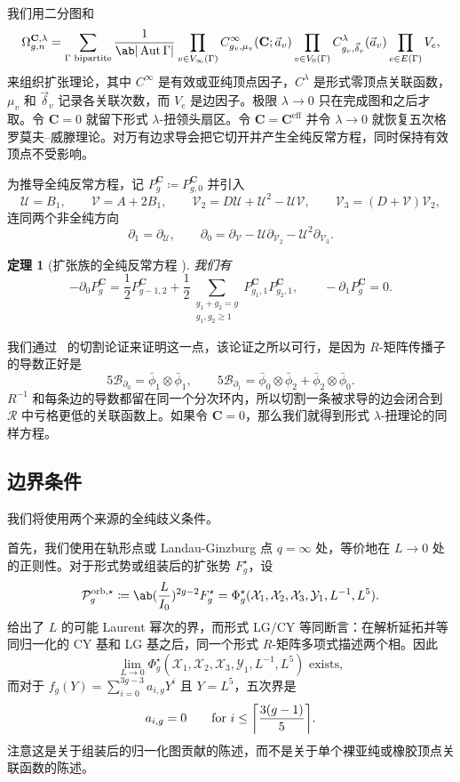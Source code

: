 \documentclass{amsart}
\newtheorem{thm}{定理}[section]
\theoremstyle{definition}
\theoremstyle{remark}
\theoremstyle{plain}
\theoremstyle{definition}
\theoremstyle{remark}
\DeclarePairedDelimiter{\ceil}{\lceil}{\rceil}
\newcommand{\g}{\mathfrak{g}}
\newcommand{\mc}[1]{\mathcal{#1}}
\newcommand{\mbf}[1]{\mathbf{#1}}
\newcommand{\mr}[1]{\mathrm{#1}}
\newcommand{\1}{\mathbf{1}}
\newcommand{\2}{\mathbf{2}}
\newcommand{\3}{\mathbf{3}}
\DeclareMathOperator{\Aut}{Aut}
\begin{document}
我们用二分图和
\[ \Omega^{\mbf{C},\lambda}_{g,n} = \sum_{\Gamma \text{ bipartite}} \frac{1}{\ab|\Aut\Gamma|}\prod_{v\in V_{\infty}(\Gamma)} C^{\infty}_{g_v,\mu_v}(\mbf{C};\vec{a}_v) \prod_{v \in V_0(\Gamma)}C^{\lambda}_{g_v,\vec{\delta}_v}(\vec{a}_v)\prod_{e \in E(\Gamma)}V_e, \]
来组织扩张理论，其中 \(C^{\infty}\) 是有效或亚纯顶点因子，\(C^{\lambda}\) 是形式零顶点关联函数，\(\mu_v\) 和 \(\vec{\delta}_v\) 记录各关联次数，而 \(V_e\) 是边因子。极限 \(\lambda \to 0\) 只在完成图和之后才取。令 \(\mbf{C}=0\) 就留下形式 \(\lambda\)-扭领头扇区。令 \(\mbf{C}=\mbf{C}^{\mr{eff}}\) 并令 \(\lambda\to0\) 就恢复五次格罗莫夫–威滕理论。对万有边求导会把它切开并产生全纯反常方程，同时保持有效顶点不受影响。

为推导全纯反常方程，记 \(P^{\mbf{C}}_g \coloneqq P^{\mbf{C}}_{g,0}\) 并引入
\[ \mc{U} = B_1, \qquad \mc{V} = A + 2B_1, \qquad \mc{V}_2 = D\mc{U} + \mc{U}^2 - \mc{U}\mc{V}, \qquad \mc{V}_3 = (D+\mc{V})\mc{V}_2, \]
连同两个非全纯方向
\[ \partial_1 = \partial_{\mc{U}}, \qquad \partial_0 = \partial_{\mc{V}} - \mc{U}\partial_{\mc{V}_2} - \mc{U}^2\partial_{\mc{V}_3}. \]

\begin{thm}[扩张族的全纯反常方程 {\cite{GJRstructure}}]
    我们有
    \[ -\partial_0 P^{\mbf{C}}_g = \frac{1}{2}P^{\mbf{C}}_{g-1,2} + \frac{1}{2}\sum_{\substack{g_1+g_2=g\\g_1,g_2\geq1}}P^{\mbf{C}}_{g_1,1}P^{\mbf{C}}_{g_2,1}, \qquad -\partial_1 P^{\mbf{C}}_g = 0. \]
\end{thm}

我们通过~ 的切割论证来证明这一点，该论证之所以可行，是因为 \(R\)-矩阵传播子的导数正好是
\[ 5\mc{B}_{\partial_0} = \bar{\phi}_1 \otimes \bar{\phi}_1, \qquad 5\mc{B}_{\partial_1} = \bar{\phi}_0\otimes\bar{\phi}_2 + \bar{\phi}_2\otimes\bar{\phi}_0. \]
\(R^{-1}\) 和每条边的导数都留在同一个分次环内，所以切割一条被求导的边会闭合到 \(\mc{R}\) 中亏格更低的关联函数上。如果令 \(\mbf{C}=0\)，那么我们就得到形式 \(\lambda\)-扭理论的同样方程。

\subsection{边界条件}%
\label{sub:Boundary conditions}

我们将使用两个来源的全纯歧义条件。

首先，我们使用在轨形点或 Landau-Ginzburg 点 \(q = \infty\) 处，等价地在 \(L \to 0\) 处的正则性。对于形式势或组装后的扩张势 \(F_g^{\star}\)，设
\[ \mc{P}_g^{\mr{orb},\star} \coloneqq \ab(\frac{L}{I_0})^{2g-2}F_g^{\star} = \Phi_g^{\star}(\mc{X}_1,\mc{X}_2,\mc{X}_3,\mc{Y}_1,L^{-1},L^5). \]
 给出了 \(L\) 的可能 Laurent 幂次的界，而形式 LG/CY 等同断言：在解析延拓并等同归一化的 CY 基和 LG 基之后，同一个形式 \(R\)-矩阵多项式描述两个相。因此
\[ \lim_{L\to0}\Phi_g^{\star}(\mc{X}_1,\mc{X}_2,\mc{X}_3,\mc{Y}_1,L^{-1},L^5) \text{ exists}, \]
而对于 \(f_g(Y) = \sum_{i=0}^{3g-3}a_{i,g}Y^i\) 且 \(Y = L^5\)，五次界是
\[ a_{i,g} = 0 \qquad \text{for } i \leq \ceil*{\frac{3(g-1)}{5}}. \]
注意这是关于组装后的归一化图贡献的陈述，而不是关于单个裸亚纯或橡胶顶点关联函数的陈述。
\end{document}
